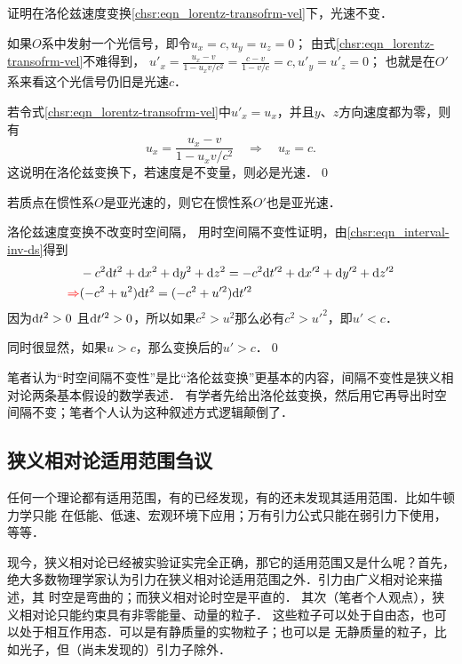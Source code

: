 \begin{example}
    证明在洛伦兹速度变换\eqref{chsr:eqn_lorentz-transofrm-vel}下，光速不变．
\end{example}
如果$O$系中发射一个光信号，即令$u_x=c,u_y=u_z=0$；
由式\eqref{chsr:eqn_lorentz-transofrm-vel}不难得到，
$u'_x = \frac{u_x -v}{1-u_x v/c^2} = \frac{c -v}{1-  v/c} = c, u'_y=u'_z=0$；
也就是在$O'$系来看这个光信号仍旧是光速$c$．

若令式\eqref{chsr:eqn_lorentz-transofrm-vel}中$u'_x=u_x$，并且$y$、$z$方向速度都为零，则有
\begin{equation}
    u_x = \frac{u_x -v}{1-u_x v/c^2} \quad \Rightarrow \quad u_x =c.  
\end{equation}
这说明在洛伦兹变换下，若速度是不变量，则必是光速．\qed


\begin{example}\label{chsr:exam_ucc}
    若质点在惯性系$O$是亚光速的，则它在惯性系$O'$也是亚光速．
\end{example}
洛伦兹速度变换不改变时空间隔，
用时空间隔不变性证明，由\eqref{chsr:eqn_interval-inv-ds}得到
\begin{align}
   & -c^2{\rm d}t^2 +{\rm d}x^2 +{\rm d}y^2 +{\rm d}z^2
   = -c^2{\rm d}t'^2 +{\rm d}x'^2 +{\rm d}y'^2 +{\rm d}z'^2 \notag \\
  {\color{red}\Rightarrow} & (-c^2 + u^2) {\rm d}t^2  = (-c^2 + u'^2) {\rm d}t'^2
\end{align}
因为${\rm d}t^2 >0$ 且${\rm d}t'^2 >0$，所以如果$c^2 > u^2$那么必有$c^2 > u'^2$，即$u'<c$．

同时很显然，如果$u>c$，那么变换后的$u'>c$．\qed

\begin{remark}
    笔者认为“时空间隔不变性”是比“洛伦兹变换”更基本的内容，间隔不变性是狭义相对论两条基本假设的数学表述．
    有学者先给出洛伦兹变换，然后用它再导出时空间隔不变；笔者个人认为这种叙述方式逻辑颠倒了．
\end{remark}


\subsection{狭义相对论适用范围刍议}\label{chsr:sec_SR-scope}
任何一个理论都有适用范围，有的已经发现，有的还未发现其适用范围．比如牛顿力学只能
在低能、低速、宏观环境下应用；万有引力公式只能在弱引力下使用，等等．

现今，狭义相对论已经被实验证实完全正确，那它的适用范围又是什么呢？首先，
绝大多数物理学家认为引力在狭义相对论适用范围之外．引力由广义相对论来描述，其
时空是弯曲的；而狭义相对论时空是平直的．
其次（笔者个人观点），狭义相对论{\heiti 只能}约束具有{\heiti 非零}能量、动量的粒子．
这些粒子可以处于自由态，也可以处于相互作用态．可以是有静质量的实物粒子；也可以是
无静质量的粒子，比如光子，但（尚未发现的）引力子除外．

